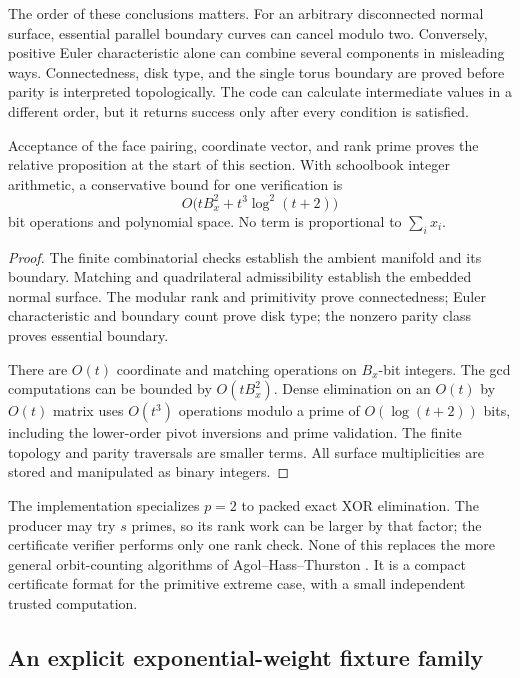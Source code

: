 The order of these conclusions matters. For an arbitrary disconnected
normal surface, essential parallel boundary curves can cancel modulo two.
Conversely, positive Euler characteristic alone can combine several
components in misleading ways. Connectedness, disk type, and the single
torus boundary are proved before parity is interpreted topologically.
The code can calculate intermediate values in a different order, but it
returns success only after every condition is satisfied.

\begin{theorem}
\label{thm:disk}
Acceptance of the face pairing, coordinate vector, and rank prime proves
the relative proposition at the start of this section. With schoolbook
integer arithmetic, a conservative bound for one verification is
\[
 O\bigl(tB_x^2+t^3\log^2(t+2)\bigr)
\]
bit operations and polynomial space. No term is proportional to
$\sum_i x_i$.
\end{theorem}
\begin{proof}
The finite combinatorial checks establish the ambient manifold and its
boundary. Matching and quadrilateral admissibility establish the embedded
normal surface. The modular rank and primitivity prove connectedness;
Euler characteristic and boundary count prove disk type; the nonzero
parity class proves essential boundary.

There are $O(t)$ coordinate and matching operations on $B_x$-bit integers.
The gcd computations can be bounded by $O(tB_x^2)$. Dense elimination on
an $O(t)$ by $O(t)$ matrix uses $O(t^3)$ operations modulo a prime of
$O(\log(t+2))$ bits, including the lower-order pivot inversions and prime
validation. The finite topology and parity traversals are smaller terms.
All surface multiplicities are stored and manipulated as binary integers.
\end{proof}

The implementation specializes $p=2$ to packed exact XOR elimination.
The producer may try $s$ primes, so its rank work can be larger by that
factor; the certificate verifier performs only one rank check. None of
this replaces the more general orbit-counting algorithms of
Agol--Hass--Thurston \cite{aht}. It is a compact certificate format for
the primitive extreme case, with a small independent trusted computation.

\subsection{An explicit exponential-weight fixture family}
\label{sec:fibonacci}

